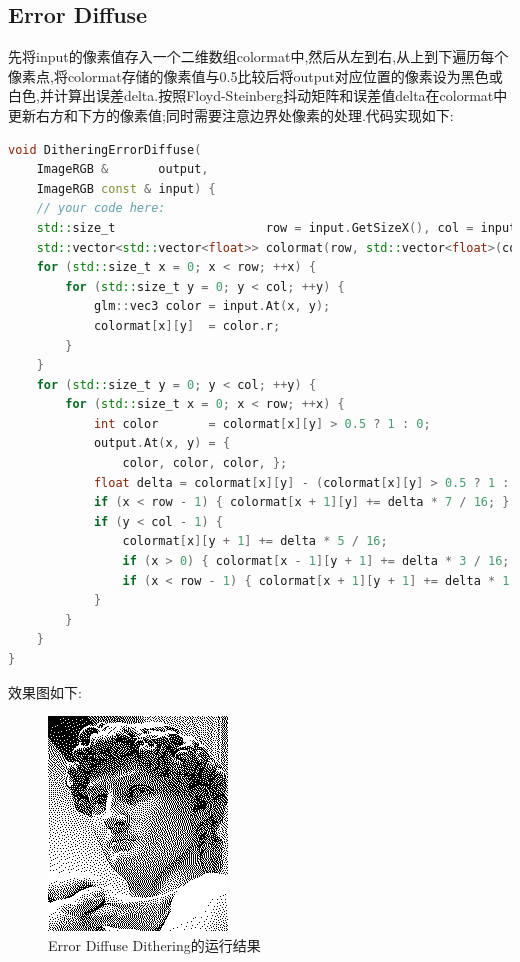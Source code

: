 \documentclass{ctexart}
\begin{document}
\subsection*{Error Diffuse}
先将{\codefont input}的像素值存入一个二维数组{\codefont colormat}中,然后从左到右,从上到下遍历每个像素点,将{\codefont colormat}存储的像素值与0.5比较后将{\codefont output}对应位置的像素设为黑色或白色,并计算出误差{\codefont delta}.按照Floyd-Steinberg抖动矩阵和误差值{\codefont delta}在{\codefont colormat}中更新右方和下方的像素值;同时需要注意边界处像素的处理.代码实现如下:
\begin{lstlisting}[language=C++]
void DitheringErrorDiffuse(
    ImageRGB &       output,
    ImageRGB const & input) {
    // your code here:
    std::size_t                     row = input.GetSizeX(), col = input.GetSizeY();
    std::vector<std::vector<float>> colormat(row, std::vector<float>(col, 0));
    for (std::size_t x = 0; x < row; ++x) {
        for (std::size_t y = 0; y < col; ++y) {
            glm::vec3 color = input.At(x, y);
            colormat[x][y]  = color.r;
        }
    }
    for (std::size_t y = 0; y < col; ++y) {
        for (std::size_t x = 0; x < row; ++x) {
            int color       = colormat[x][y] > 0.5 ? 1 : 0;
            output.At(x, y) = {
                color, color, color, };
            float delta = colormat[x][y] - (colormat[x][y] > 0.5 ? 1 : 0);
            if (x < row - 1) { colormat[x + 1][y] += delta * 7 / 16; }
            if (y < col - 1) {
                colormat[x][y + 1] += delta * 5 / 16;
                if (x > 0) { colormat[x - 1][y + 1] += delta * 3 / 16; }
                if (x < row - 1) { colormat[x + 1][y + 1] += delta * 1 / 16; }
            }
        }
    }
}   
\end{lstlisting}
效果图如下:
\begin{figure}[H]
    \centering\includegraphics[scale=0.75]{figure/ErrorDiffuse.png}
    \caption{Error Diffuse Dithering的运行结果}
\end{figure}
\end{document}
